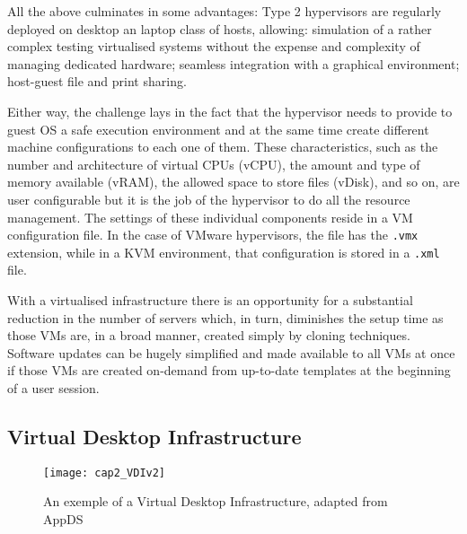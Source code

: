 \begin{description}
	All the above culminates in some advantages: Type 2 hypervisors are regularly deployed on desktop an laptop class of hosts, allowing: simulation of a rather complex testing virtualised systems without the expense and complexity of managing dedicated hardware; seamless integration with a graphical environment; host-guest file and print sharing.
\end{description}

Either way, the challenge lays in the fact that the hypervisor needs to provide to guest OS a safe execution environment and at the same time create different machine configurations to each one of them. These characteristics, such as the number and architecture of virtual CPUs (vCPU), the amount and type of memory available (vRAM), the allowed space to store files (vDisk), and so on, are user configurable but it is the job of the hypervisor to do all the resource management. The settings of these individual components reside in a VM configuration file. In the case of VMware hypervisors, the file has the \texttt{.vmx} extension,\cite{VMWare_VMFiles,Portnoy2012} while in a KVM environment, that configuration is stored in a \texttt{.xml} file.~\cite{chirammal2016}

With a virtualised infrastructure there is an opportunity for a substantial reduction in the number of servers which, in turn, diminishes the setup time as those VMs are, in a broad manner, created simply by cloning techniques. Software updates can be hugely simplified and made available to all VMs at once if those VMs are created on-demand from up-to-date templates at the beginning of a user session.


\subsection{Virtual Desktop Infrastructure} %
\label{sub:res_vdi}

\begin{figure}[htbp]
	\centering
	\texttt{[image: cap2\_VDIv2]}
	\caption{An exemple of a Virtual Desktop Infrastructure, adapted from AppDS~\cite{appds_2017}}
	\label{fig:VDI}
\end{figure}

